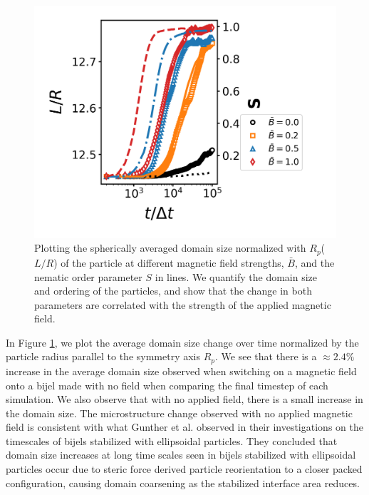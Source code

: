 \begin{figure} 
    \centering 
    \includegraphics[width=\columnwidth]{../figures/results/paper2/domain_size-field_on.png} 
    \caption{Plotting the spherically averaged domain size normalized with $R_p$($L/R$) of the 
             particle at different magnetic field strengths, $\bar{B}$, and the nematic order parameter $S$ in lines.
             We quantify the domain size and ordering of the particles, and show that the change in both parameters
            are correlated with the strength of the applied magnetic field.} 
    \label{fig:domain_size-field_on} 
    \end{figure}

In Figure \ref{fig:domain_size-field_on}, we plot the average domain size change over time normalized by the particle 
radius parallel to the symmetry axis $R_p$. We see that there is a $\approx 2.4\%$ increase in the average domain size 
observed when switching on a magnetic field onto a bijel made with no field when comparing the final timestep of each 
simulation. We also observe that with no applied field, there is a small increase in the domain size. The 
microstructure change observed with no applied magnetic field is consistent with what Gunther et al. observed 
in their investigations on the timescales of bijels stabilized with ellipsoidal particles. \cite{gunther_timescales_2014} 
They concluded that domain size increases at long time scales seen in bijels stabilized with ellipsoidal particles 
occur due to steric force derived particle reorientation to a closer packed configuration, causing domain coarsening 
as the stabilized interface area reduces.

